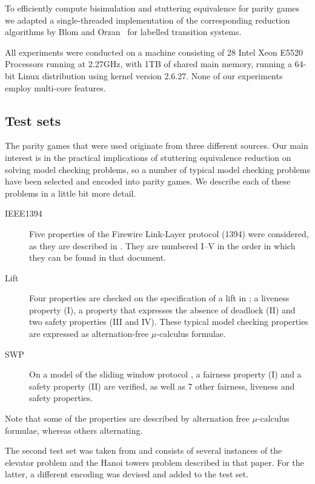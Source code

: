 \documentclass[a4paper]{llncs}
\begin{document}
To efficiently compute bisimulation and stuttering equivalence for parity
games we ad{\color{red}a}pted a single-threaded implementation of the corresponding
reduction algorithms by Blom and Orzan~\cite{BO:03} for labelled
transition systems.

All experiments were conducted on a machine consisting of 28 
Intel\textregistered{} Xeon\textregistered{} E5520 Processors running at 
2.27GHz, with 1TB of shared main memory, running a 64-bit Linux distribution 
using kernel version 2.6.27. None of our experiments employ multi-core features.

\subsection{Test sets}

The parity games that were used originate from three different sources. Our
main interest is in the practical implications of stuttering equivalence 
reduction on solving model checking problems, so a number of typical model
checking problems have been selected and encoded into parity games. We describe each of
these problems in a little bit more detail.
\begin{description}
\item[IEEE1394] Five properties of the Firewire Link-Layer protocol (1394) 
  \cite{Lut:97} were considered, as they are described in \cite{SM:98}. They are
  numbered I--V in the order in which they can be found in that document.
\item[Lift] Four properties are checked on the specification of a lift in
  \cite{GPW:03}; a liveness property (I), a property that expresses the absence
  of deadlock (II) and two safety properties (III and IV). These typical model
  checking properties are expressed as alternation-free $\mu$-calculus formulae.
\item[SWP] On a model of the sliding window protocol \cite{BFGPP:05}, a 
  fairness property (I) and a safety property (II) are verified, as well as 7
  other fairness, liveness and safety properties.
\end{description}
Note that some of the properties are described by alternation free
$\mu$-calculus formulae, whereas others alternating.

The second test set was taken from \cite{FL:09} and consists of several 
instances of the elevator problem and the Hanoi towers problem described in
that paper. For the latter, a different encoding was devised and added
to the test set.
\end{document}
